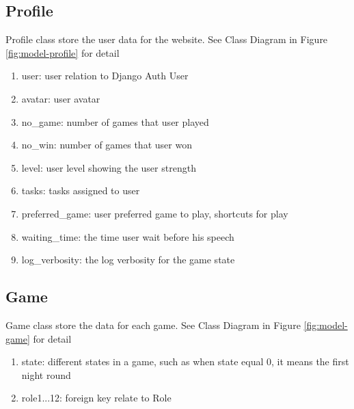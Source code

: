 \documentclass[11pt]{article}
\begin{document}
\subsection{Profile}
Profile class store the user data for the website. See Class Diagram in Figure \ref{fig:model-profile} for detail
\begin{enumerate}
\item
user: user relation to Django Auth User
\item
avatar: user avatar
\item
no\_game: number of games that user played
\item
no\_win: number of games that user won
\item
level: user level showing the user strength
\item
tasks: tasks assigned to user
\item
preferred\_game: user preferred game to play, shortcuts for play
\item
waiting\_time: the time user wait before his speech
\item
log\_verbosity: the log verbosity for the game state
\end{enumerate}

\subsection{Game}
Game class store the data for each game. See Class Diagram in Figure \ref{fig:model-game} for detail
\begin{enumerate}
\item
state: different states in a game, such as when state equal 0, it means the first night round
\item
role1...12: foreign key relate to Role
\end{enumerate}
\end{document}
